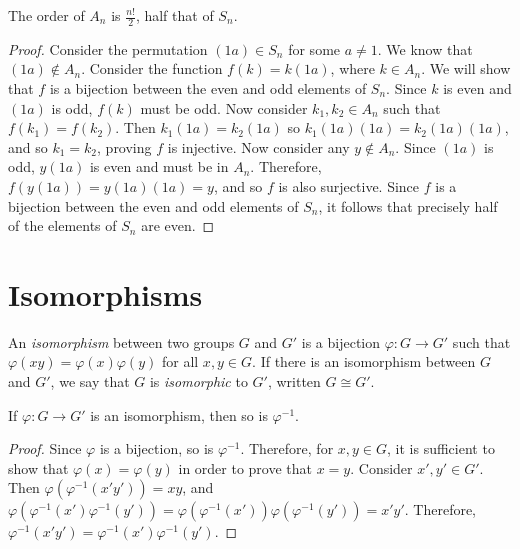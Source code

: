 \begin{prop}
    The order of $A_n$ is $\frac{n!}{2}$, half that of $S_n$.
\end{prop}

\begin{proof}
    Consider the permutation $(1a) \in S_n$ for some $a \neq 1$. We know that $(1a) \not\in A_n$. Consider the function $f(k) = k(1a)$, where $k \in A_n$. We will show that $f$ is a bijection between the even and odd elements of $S_n$. Since $k$ is even and $(1a)$ is odd, $f(k)$ must be odd. Now consider $k_1, k_2 \in A_n$ such that $f(k_1) = f(k_2)$. Then $k_1(1a) = k_2(1a)$ so $k_1(1a)(1a) = k_2(1a)(1a)$, and so $k_1 = k_2$, proving $f$ is injective. Now consider any $y \not\in A_n$. Since $(1a)$ is odd, $y(1a)$ is even and must be in $A_n$. Therefore, $f(y(1a)) = y(1a)(1a) = y$, and so $f$ is also surjective. Since $f$ is a bijection between the even and odd elements of $S_n$, it follows that precisely half of the elements of $S_n$ are even.
\end{proof}

\section{Isomorphisms}

\begin{defn}
    An \emph{isomorphism} between two groups $G$ and $G'$ is a bijection $\varphi: G \to G'$ such that $\varphi(xy) = \varphi(x)\varphi(y)$ for all $x, y \in G$. If there is an isomorphism between $G$ and $G'$, we say that $G$ is \emph{isomorphic} to $G'$, written $G \cong G'$.
\end{defn}

\begin{prop}\label{isomorphism-inverse}
    If $\varphi: G \to G'$ is an isomorphism, then so is $\varphi^{-1}$.
\end{prop}

\begin{proof}
    Since $\varphi$ is a bijection, so is $\varphi^{-1}$. Therefore, for $x, y \in G$, it is sufficient to show that $\varphi(x) = \varphi(y)$ in order to prove that $x = y$. Consider $x', y' \in G'$. Then $\varphi\left(\varphi^{-1}(x'y')\right) = xy$, and $\varphi\left(\varphi^{-1}(x')\varphi^{-1}(y')\right) = \varphi\left(\varphi^{-1}(x')\right)\varphi\left(\varphi^{-1}(y')\right) = x'y'$. Therefore, $\varphi^{-1}(x'y') = \varphi^{-1}(x')\varphi^{-1}(y')$.
\end{proof}

